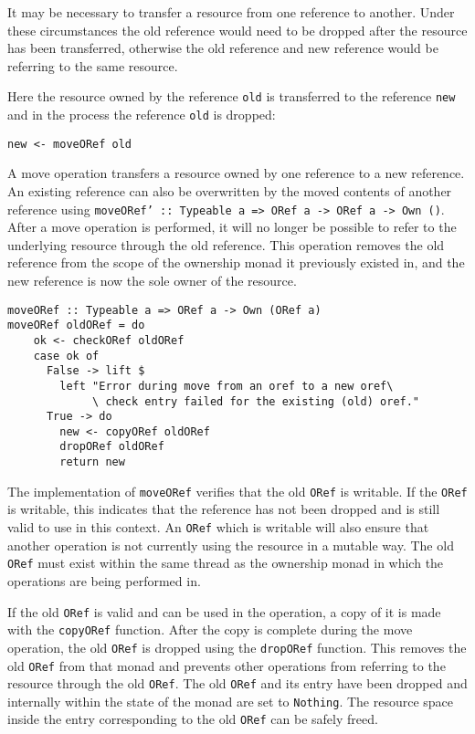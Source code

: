 \documentclass[onehalf,11pt]{beavtex}
\begin{document}
It may be necessary to transfer a resource from one reference to another.
Under these circumstances the old reference would need to be dropped after the
resource has been transferred, otherwise the old reference and new reference
would be referring to the same resource.

Here the resource owned by the reference \texttt{old} is transferred to the
reference \texttt{new} and in the process the reference \texttt{old} is dropped:

\begin{verbatim}
new <- moveORef old
\end{verbatim}

A move operation transfers a resource owned by one reference to a new reference.
An existing reference can also be overwritten by the moved contents of another
reference using \texttt{moveORef' :: Typeable a => ORef a -> ORef a -> Own ()}.
After a move operation is performed, it will no longer be possible to refer to
the underlying resource through the old reference.
This operation removes the old reference from the scope of the ownership monad
it previously existed in, and the new reference is now the sole owner of the
resource.

\begin{verbatim}
moveORef :: Typeable a => ORef a -> Own (ORef a)
moveORef oldORef = do
    ok <- checkORef oldORef
    case ok of
      False -> lift $
        left "Error during move from an oref to a new oref\
             \ check entry failed for the existing (old) oref."
      True -> do
        new <- copyORef oldORef
        dropORef oldORef
        return new
\end{verbatim}

The implementation of \texttt{moveORef} verifies that the old \texttt{ORef}
is writable.
If the \texttt{ORef} is writable, this indicates that the reference has not been
dropped and is still valid to use in this context.
An \texttt{ORef} which is writable will also ensure that another operation is
not currently using the resource in a mutable way.
The old \texttt{ORef} must exist within the same thread as the ownership monad
in which the operations are being performed in.

If the old \texttt{ORef} is valid and can be used in the operation, a copy of
it is made with the \texttt{copyORef} function.
After the copy is complete during the move operation, the old \texttt{ORef} is
dropped using the \texttt{dropORef} function.
This removes the old \texttt{ORef} from that monad and prevents other operations
from referring to the resource through the old \texttt{ORef}.
The old \texttt{ORef} and its entry have been dropped and internally within the
state of the monad are set to \texttt{Nothing}.
The resource space inside the entry corresponding to the old \texttt{ORef} can
be safely freed.
\end{document}
